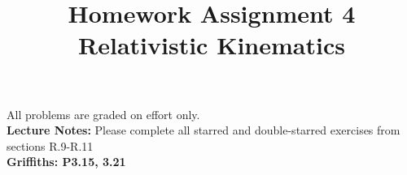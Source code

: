 \documentclass[12pt]{article}
\begin{document}
\date{\vspace{-5ex}}

\title{Homework Assignment 4 \\ Relativistic Kinematics}

\maketitle

\noindent
All problems are graded on effort only.\\

\noindent
{\bf Lecture Notes:}  Please complete all starred and double-starred exercises from sections R.9-R.11\\

\noindent
{\bf Griffiths: P3.15, 3.21}\\

\end{document}
